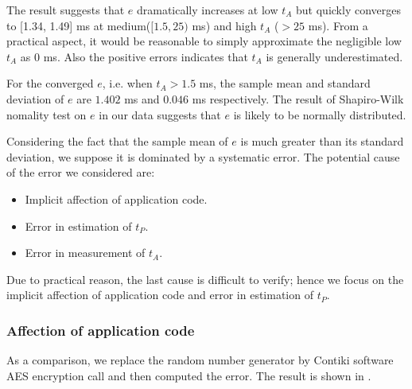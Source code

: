The result suggests that $e$ dramatically increases at low $t_A$ but quickly converges to [1.34, 1.49] ms at medium($[1.5, 25)$ ms) and high $t_A$ ($>25$ ms). From a practical aspect, it would be reasonable to simply approximate the negligible low $t_A$ as $0$ ms. Also the positive errors indicates that $t_A$ is generally underestimated.

For the converged $e$, i.e. when $t_A > 1.5$ ms, the sample mean and standard deviation of $e$ are $1.402$ ms and $0.046$ ms respectively. The result of Shapiro-Wilk nomality test on $e$ in our data suggests that $e$ is likely to be normally  distributed.

Considering the fact that the sample mean of $e$ is much greater than its standard deviation, we suppose it is dominated by a systematic error. The potential cause of the error we considered are:
\begin{itemize}
	\item Implicit affection of application code.
	\item Error in estimation of $t_P$.
	\item Error in measurement of $t_A$.
\end{itemize}

Due to practical reason, the last cause is difficult to verify; hence we focus on the implicit affection of application code and error in estimation of $t_P$.

\subsubsection{Affection of application code} \label{Affection of application code}

As a comparison, we replace the random number generator by Contiki software AES encryption call and then computed the error. The result is shown in .

